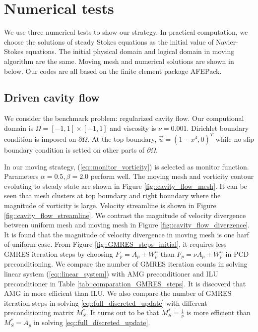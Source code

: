 \documentclass{eajam}
\begin{document}
\section{Numerical tests}
      \label{sec5} We use three numerical tests to show our strategy.
      In practical computation, we choose the solutions of steady
      Stokes equations as the initial value of Navier-Stokes
      equations. The initial physical domain
      and logical domain in moving algorithm are the same. Moving mesh
      and numerical solutions are shown in below. Our codes are all
      based on the finite element package AFEPack.

     \subsection{Driven cavity flow}
       We consider the benchmark problem: regularized cavity flow. Our
       computional domain is $\Omega = [-1, 1] \times [-1, 1]$ and
       viscosity is $\nu = 0.001$. Dirichlet boundary condition is
       imposed on $\partial \Omega$. At the top boundary, $\vec{u} =
       (1 - x^4, 0)^T$ while no-slip boundary condition is setted on
       other parts of $\partial \Omega$.
       
       In our moving strategy, (\ref{eq::monitor_vorticity}) is
       selected as monitor function. Parameters $\alpha = 0.5, \beta =
       2.0$ perform well. The moving mesh and vorticity contour
       evoluting to steady state are shown in Figure
       \ref{fig::cavity_flow_mesh}. It can be seen that mesh clusters
       at top boundary and right boundary where the magnitude of
       vorticity is large. Velocity streamline is shown in Figure
       \ref{fig::cavity_flow_streamline}. We contrast the magnitude of
       velocity divergence between uniform mesh and moving mesh in
       Figure \ref{fig::cavity_flow_divergence}. It is found that the
       magnitude of velocity divergence in moving mesh is one harf of
       uniform case.
       From Figure \ref{fig::GMRES_steps_initial}, it requires less GMRES
       iteration steps by choosing $F_p = A_p + W_p^n$ than $F_p = \nu
       A_p + W_p^n$ in PCD preconditioning. We compare the number of
       GMRES iteration counts in solving linear system
       (\ref{eq::linear_system}) with AMG preconditioner and ILU
       preconditioner in Table \ref{tab::comparation_GMRES_steps}. It
       is discoverd that AMG in more efficient than ILU. We also
       compare the number of GMRES iteration steps in solving
       \eqref{eq::full_discreted_update} with different
       preconditioning matrix $M_S^*$. It turns out to be that $M_S^*
       = \frac{1}{\nu}$ is more efficient than $M_S^* = A_p$ in
       solving \eqref{eq::full_discreted_update}.
       
\end{document}
